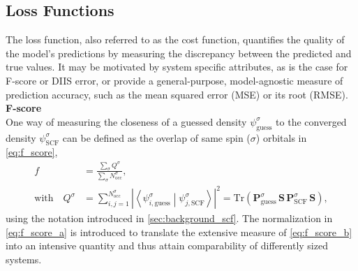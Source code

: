 \subsection{Loss Functions}
\label{subsec:background_loss_function}
The loss function, also referred to as the cost function, quantifies the quality of the model's predictions by measuring the discrepancy between the predicted and true values. It may be motivated by system specific attributes, as is the case for F-score or DIIS error, or provide a general-purpose, model-agnostic measure of prediction accuracy, such as the mean squared error (MSE) or its root (RMSE). \\

\textbf{F-score}\\
One way of measuring the closeness of a guessed density $\psi^\sigma_{\text{guess}}$ to the converged density $\psi^\sigma_{\text{SCF}}$ can be defined as the overlap of same spin ($\sigma$) orbitals in \autoref{eq:f_score},
\begin{subequations}
\label{eq:f_score}
\begin{align}
    f &= \frac{\sum\limits_\sigma Q^\sigma}{\sum\limits_\sigma N^\sigma_\text{occ}}, \label{eq:f_score_a}\\
    \text{with} \quad Q^\sigma &= \sum_{i,j=1}^{N^\sigma_\text{occ}} \left| \left\langle \psi^\sigma_{i,\text{guess}} \middle| \psi^\sigma_{j,\text{SCF}} \right\rangle \right|^2 = \mathrm{Tr}\left( \mathbf{P}^{\sigma}_\text{guess} \, \mathbf{S} \, \mathbf{P}^{\sigma}_\text{SCF} \, \mathbf{S} \right),  \label{eq:f_score_b}
\end{align}
\end{subequations}
using the notation introduced in \autoref{sec:background_scf}. The normalization in \autoref{eq:f_score_a} is introduced to translate the extensive measure of \autoref{eq:f_score_b} into an intensive quantity and thus attain comparability of differently sized systems.


